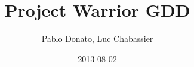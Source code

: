 \documentclass{article}
\title{Project Warrior GDD}
\author{Pablo Donato, Luc Chabassier}
\begin{document}
\date{2013-08-02}
\maketitle
\clearpage


\end{document}
